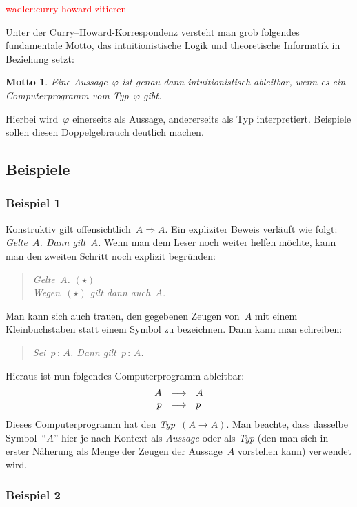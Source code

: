 \documentclass[a4paper,ngerman,12pt]{scrartcl}
\theoremstyle{definition}
\theoremstyle{plain}
\newtheorem{motto}[defn]{Motto}
\theoremstyle{remark}
\renewcommand{\_}{\mathpunct{.}\,}
\newcommand{\?}{\,{:}\,}
\newcommand{\XXX}[1]{\textcolor{red}{#1}}
\begin{document}
\XXX{wadler:curry-howard zitieren}

Unter der Curry--Howard-Korrespondenz versteht man grob folgendes fundamentale
Motto, das intuitionistische Logik und theoretische Informatik in Beziehung
setzt:

\begin{motto}Eine Aussage~$\varphi$ ist genau dann intuitionistisch ableitbar,
wenn es ein Computerprogramm vom Typ~$\varphi$ gibt.\end{motto}

Hierbei wird~$\varphi$ einerseits als Aussage, andererseits als Typ
interpretiert. Beispiele sollen diesen Doppelgebrauch deutlich machen.


\subsection{Beispiele}

\subsubsection*{Beispiel 1}

Konstruktiv gilt offensichtlich~$A \Rightarrow A$. Ein expliziter Beweis
verläuft wie folgt: \emph{Gelte~$A$. Dann gilt~$A$.} Wenn man dem Leser noch
weiter helfen möchte, kann man den zweiten Schritt noch explizit begründen:
\begin{quote}\emph{Gelte~$A$. $(\star)$ \\ Wegen~$(\star)$ gilt dann
auch~$A$.}\end{quote}
Man kann sich auch trauen, den gegebenen Zeugen von~$A$ mit einem
Kleinbuchstaben statt einem Symbol zu bezeichnen. Dann kann man schreiben:
\begin{quote}\emph{Sei~$p\?A$. Dann gilt~$p\?A$.}\end{quote}
Hieraus ist nun folgendes Computerprogramm ableitbar:
\[ \begin{array}{@{}rcl@{}}
  A &\longrightarrow& A \\
  p &\longmapsto& p
\end{array} \]
Dieses Computerprogramm hat den \emph{Typ}~$(A \to A)$. Man beachte, dass
dasselbe Symbol~"`$A$"' hier je nach Kontext als \emph{Aussage} oder als
\emph{Typ} (den man sich in erster Näherung als Menge der Zeugen der
Aussage~$A$ vorstellen kann) verwendet wird.


\subsubsection*{Beispiel 2}
\end{document}
